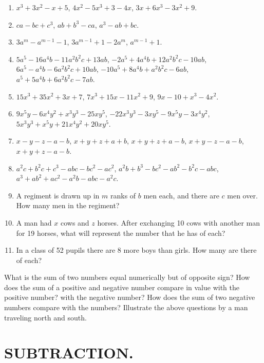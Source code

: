 \documentclass{book}
\begin{document}
\begin{enumerate}
\item $x^3 + 3x^2 - x + 5$, $4x^2 - 5x^3 + 3 - 4x$, $3x + 6x^3 -
3x^2 + 9$.

\item $ca - bc + c^3$, $ab + b^3 - ca$, $a^3 - ab + bc$.

\item $3a^m - a^{m-1} - 1$, $3a^{m-1} + 1 - 2a^m$, $a^{m-1} + 1$.

\item $5a^5 - 16a^4b - 11a^2b^2c + 13ab$, $-2a^5 + 4a^4b +
12a^2b^2c - 10ab$, $6a^5 - a^4b - 6a^2b^2c + 10ab$, $-10a^5 +
8a^4b + a^2b^2c - 6ab$, $a^5 + 5a^4b + 6a^2b^2c - 7ab$.

\item $15x^3 + 35x^2 + 3x +7$, $7x^3 + 15x - 11x^2 + 9$, $9x - 10
+ x^3 - 4x^2$.

\item $9x^5y - 6x^4y^2 + x^3y^3 - 25xy^5$, $-22x^3y^3 - 3xy^5 -
9x^5y - 3x^4y^2$, $5x^3y^3 + x^5y + 21x^4y^2 + 20xy^5$.

\item $x - y - z - a - b$, $x + y + z + a + b$, $x + y + z + a -
b$, $x + y - z - a - b$, $x + y + z - a - b$.

\item $a^2c + b^2c + c^3 - abc - bc^2 - ac^2$, $a^2b + b^3 - bc^2
- ab^2 - b^2c - abc$, $a^3 + ab^2 + ac^2 - a^2b - abc - a^2c$.

\item A regiment is drawn up in $m$ ranks of $b$ men each, and
there are $c$ men over. How many men in the regiment?

\item A man had $x$ cows and $z$ horses. After exchanging 10 cows
with another man for 19 horses, what will represent the number
that he has of each?

\item In a class of 52 pupils there are 8 more boys than girls.
How many are there of each?
\end{enumerate}

What is the sum of two numbers equal numerically
but of opposite sign? How does the sum of a positive
and negative number compare in value with the positive
number? with the negative number? How does the
sum of two negative numbers compare with the numbers?
Illustrate the above questions by a man traveling
north and south.




\section*{SUBTRACTION.}
\end{document}
